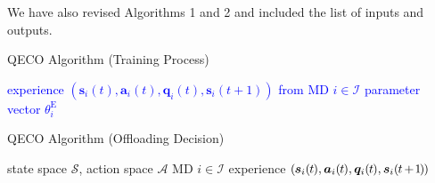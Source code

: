 \documentclass[12pt,draftclsnofoot,onecolumn]{IEEEtran}
\newcommand{\rev}[1]{{\color{blue}#1}} %
\newcommand{\rev}[1]{#1}
\newenvironment{my}[2]%
{\begin{list}{}%
{\setlength{\rightmargin}{#1}\setlength{\leftmargin}{#2}}%


 \item[]{}

} {\end{list}}
\begin{document}
\begin{enumerate}
	We have also revised Algorithms 1 and 2 and included the list of inputs and outputs.\\	
	

\begin{my}{0.5cm}{0.5cm}	
\rev{\begin{minipage}[b]{0.87\textwidth} 
	\begin{algorithm}[H] \caption{QECO Algorithm (Training Process)}\label{alg:cap2} \centering 
		\begin{algorithmic}[1] \renewcommand{\algorithmicrequire}{\textbf{\textcolor{blue}{Input:}}} \renewcommand{\algorithmicensure}{\textbf{\textcolor{blue}{Output:}}} \Require \textcolor{blue}{experience $(\boldsymbol{s}_i(t), \boldsymbol{a}_i(t), \boldsymbol{q}_i(t), \boldsymbol{s}_i(t+1))$ from MD $i \in \mathcal{I}$} \Ensure \textcolor{blue}{parameter vector $\theta_i^{\text{E}}$} 
	\end{algorithmic} 
\end{algorithm} 
\end{minipage}
\vspace{5mm}

\begin{minipage}[b]{0.87\textwidth} 
	\begin{algorithm}[H] \caption{QECO Algorithm (Offloading Decision)}\label{alg:cap2} \centering 
		\begin{algorithmic}[1] \renewcommand{\algorithmicrequire}{\textbf{Input:}} \renewcommand{\algorithmicensure}{\textbf{Output:}}\Require state space $\mathcal{S}$, action space $\mathcal{A}$
			\Ensure MD $i \in \mathcal{I}$ experience  \textcolor{blue}{ $(\hspace{-0.2mm}\boldsymbol{s}_i(\hspace{-0.2mm}t\hspace{-0.2mm}), \boldsymbol{a}_i(\hspace{-0.2mm}t\hspace{-0.2mm}), \boldsymbol{q}_i(\hspace{-0.2mm}t\hspace{-0.2mm}), \boldsymbol{s}_i(\hspace{-0.2mm}t\hspace{-0.3mm}+\hspace{-0.3mm}\hspace{-0.2mm}1\hspace{-0.2mm}\hspace{-0.2mm})\hspace{-0.2mm})$}
		\end{algorithmic} 
	\end{algorithm} 
\end{minipage}}
\end{my}
	


\end{enumerate}
\end{document}
